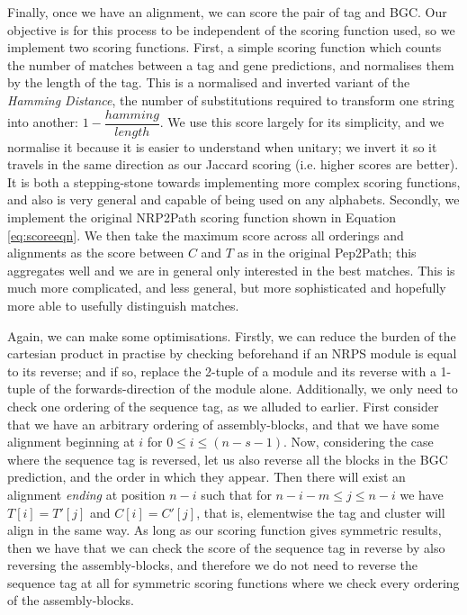 \documentclass{l4proj}
\newcommand{\cit}[1]{\citep{#1}}
\begin{document}
Finally, once we have an alignment, we can score the pair of tag and BGC. Our objective is for this process to be independent of the scoring function used, so we implement two scoring functions. First, a simple scoring function which counts the number of matches between a tag and gene predictions, and normalises them by the length of the tag. This is a normalised and inverted variant of the \textit{Hamming Distance}, \cit{hamming} the number of substitutions required to transform one string into another: \(1 - \dfrac{hamming}{length}\). We use this score largely for its simplicity, and we normalise it because it is easier to understand when unitary; we invert it so it travels in the same direction as our Jaccard scoring (i.e. higher scores are better). It is both a stepping-stone towards implementing more complex scoring functions, and also is very general and capable of being used on any alphabets. Secondly, we implement the original NRP2Path scoring function shown in Equation \ref{eq:scoreeqn}. We then take the maximum score across all orderings and alignments as the score between \(C\) and \(T\) as in the original Pep2Path; this aggregates well and we are in general only interested in the best matches. This is much more complicated, and less general, but more sophisticated and hopefully more able to usefully distinguish matches.

Again, we can make some optimisations. Firstly, we can reduce the burden of the cartesian product in practise by checking beforehand if an NRPS module is equal to its reverse; and if so, replace the 2-tuple of a module and its reverse with a 1-tuple of the forwards-direction of the module alone. Additionally, we only need to check one ordering of the sequence tag, as we alluded to earlier. First consider that we have an arbitrary ordering of assembly-blocks, and that we have some alignment beginning at \(i\) for \(0 \leq i \leq (n-s-1)\). Now, considering the case where the sequence tag is reversed, let us also reverse all the blocks in the BGC prediction, and the order in which they appear. Then there will exist an alignment \textit{ending} at position \(n-i\) such that for \(n-i-m \leq j \leq n-i\) we have \(T[i] = T'[j]\) and \(C[i] = C'[j]\), that is, elementwise the tag and cluster will align in the same way. As long as our scoring function gives symmetric results, then we have that we can check the score of the sequence tag in reverse by also reversing the assembly-blocks, and therefore we do not need to reverse the sequence tag at all for symmetric scoring functions where we check every ordering of the assembly-blocks.
\end{document}
